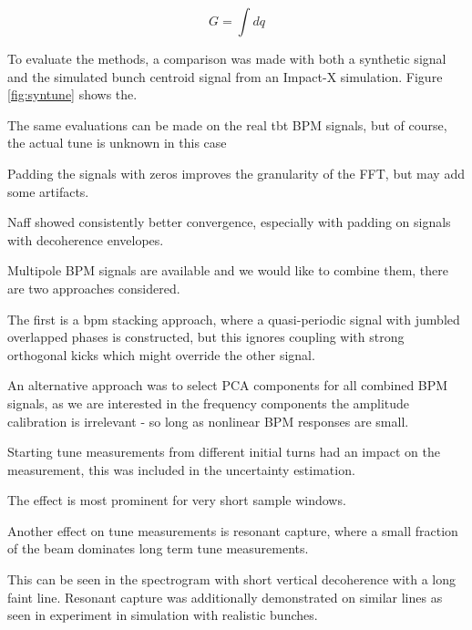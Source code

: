\begin{equation}
	G = \int dq
	\label{eq:naff}
\end{equation}

To evaluate the methods, a comparison was made with both a synthetic signal and the simulated bunch centroid signal from an Impact-X simulation. Figure \ref{fig:syntune} shows the.

The same evaluations can be made on the real tbt BPM signals, but of course, the actual tune is unknown in this case


Padding the signals with zeros improves the granularity of the FFT, but may add some artifacts.

Naff showed consistently better convergence, especially with padding on signals with decoherence envelopes.

Multipole BPM signals are available and we would like to combine them, there are two approaches considered.

The first is a bpm stacking approach, where a quasi-periodic signal with jumbled overlapped phases is constructed, but this ignores coupling with strong orthogonal kicks which might override the other signal.

An alternative approach was to select PCA components for all combined BPM signals, as we are interested in the frequency components the amplitude calibration is irrelevant - so long as nonlinear BPM responses are small.

Starting tune measurements from different initial turns had an impact on the measurement, this was included in the uncertainty estimation.

The effect is most prominent for very short sample windows.

Another effect on tune measurements is resonant capture, where a small fraction of the beam dominates long term tune measurements.

This can be seen in the spectrogram with short vertical decoherence with a long faint line.
Resonant capture was additionally demonstrated on similar lines as seen in experiment in simulation with realistic bunches.

